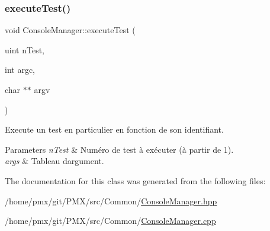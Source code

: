 \subsubsection{\texorpdfstring{execute\+Test()}{executeTest()}}
{\footnotesize\ttfamily void Console\+Manager\+::execute\+Test (\begin{DoxyParamCaption}\item[{uint}]{n\+Test,  }\item[{int}]{argc,  }\item[{char $\ast$$\ast$}]{argv }\end{DoxyParamCaption})\hspace{0.3cm}{\ttfamily [protected]}}



Execute un test en particulier en fonction de son identifiant. 


\begin{DoxyParams}{Parameters}
{\em n\+Test} & Numéro de test à exécuter (à partir de 1). \\
\hline
{\em args} & Tableau d\textquotesingle{}argument. \\
\hline
\end{DoxyParams}


The documentation for this class was generated from the following files\+:\begin{DoxyCompactItemize}
\item 
/home/pmx/git/\+P\+M\+X/src/\+Common/\hyperlink{ConsoleManager_8hpp}{Console\+Manager.\+hpp}\item 
/home/pmx/git/\+P\+M\+X/src/\+Common/\hyperlink{ConsoleManager_8cpp}{Console\+Manager.\+cpp}\end{DoxyCompactItemize}
